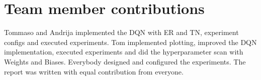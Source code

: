\documentclass{article}
\begin{document}
\section{Team member contributions}
Tommaso and Andrija implemented the DQN with ER and TN, experiment configs and executed experiments.
Tom implemented plotting, improved the DQN implementation, executed experiments and did the hyperparameter scan with Weights and Biases.
Everybody designed and configured the experiments.
The report was written with equal contribution from everyone.
\end{document}
